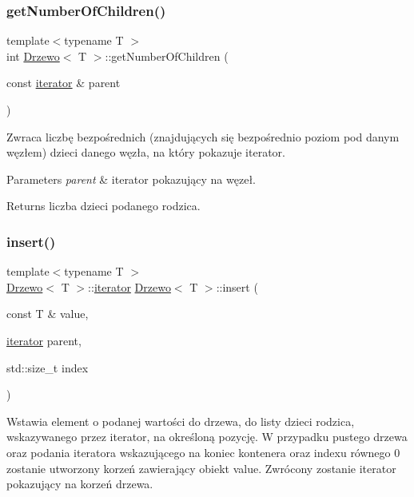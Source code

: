 \subsubsection{\texorpdfstring{get\+Number\+Of\+Children()}{getNumberOfChildren()}}
{\footnotesize\ttfamily template$<$typename T $>$ \\
int \hyperlink{class_drzewo}{Drzewo}$<$ T $>$\+::get\+Number\+Of\+Children (\begin{DoxyParamCaption}\item[{const \hyperlink{class_drzewo_1_1iterator}{iterator} \&}]{parent }\end{DoxyParamCaption})\hspace{0.3cm}{\ttfamily [inline]}}

Zwraca liczbę \textquotesingle{}bezpośrednich\textquotesingle{} (znajdujących się bezpośrednio poziom pod danym węzłem) dzieci danego węzła, na który pokazuje iterator.


\begin{DoxyParams}{Parameters}
{\em parent} & iterator pokazujący na węzeł. \\
\hline
\end{DoxyParams}
\begin{DoxyReturn}{Returns}
liczba dzieci podanego rodzica. 
\end{DoxyReturn}
\mbox{\label{class_drzewo_a3d00b2880e12a416ab749c84ff879a70}} 
\subsubsection{\texorpdfstring{insert()}{insert()}}
{\footnotesize\ttfamily template$<$typename T $>$ \\
\hyperlink{class_drzewo}{Drzewo}$<$ T $>$\+::\hyperlink{class_drzewo_1_1iterator}{iterator} \hyperlink{class_drzewo}{Drzewo}$<$ T $>$\+::insert (\begin{DoxyParamCaption}\item[{const T \&}]{value,  }\item[{\hyperlink{class_drzewo_1_1iterator}{iterator}}]{parent,  }\item[{std\+::size\+\_\+t}]{index }\end{DoxyParamCaption})}

Wstawia element o podanej wartości do drzewa, do listy dzieci rodzica, wskazywanego przez iterator, na określoną pozycję. W przypadku pustego drzewa oraz podania iteratora wskazującego na koniec kontenera oraz indexu równego \textquotesingle{}0\textquotesingle{} zostanie utworzony korzeń zawierający obiekt \textquotesingle{}value\textquotesingle{}. Zwrócony zostanie iterator pokazujący na korzeń drzewa.


